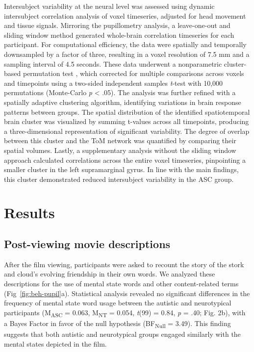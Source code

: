 Intersubject variability at the neural level was assessed using dynamic intersubject correlation analysis of voxel timeseries, adjusted for head movement and tissue signals. Mirroring the pupillometry analysis, a leave-one-out and sliding window method generated whole-brain correlation timeseries for each participant. For computational efficiency, the data were spatially and temporally downsampled by a factor of three, resulting in a voxel resolution of 7.5 mm and a sampling interval of 4.5 seconds. These data underwent a nonparametric cluster-based permutation test \citep{maris2007}, which corrected for multiple comparisons across voxels and timepoints using a two-sided independent samples \textit{t}-test with 10,000 permutations (Monte-Carlo \textit{p} < .05). The analysis was further refined with a spatially adaptive clustering algorithm, identifying variations in brain response patterns between groups. The spatial distribution of the identified spatiotemporal brain cluster was visualized by summing t-values across all timepoints, producing a three-dimensional representation of significant variability. The degree of overlap between this cluster and the ToM network was quantified by comparing their spatial volumes. Lastly, a supplementary analysis without the sliding window approach calculated correlations across the entire voxel timeseries, pinpointing a smaller cluster in the left supramarginal gyrus. In line with the main findings, this cluster demonstrated reduced intersubject variability in the ASC group.

\section*{Results}
\subsection*{Post-viewing movie descriptions }
After the film viewing, participants were asked to recount the story of the stork and cloud's evolving friendship in their own words. We analyzed these descriptions for the use of mental state words and other content-related terms (Fig~\ref{fig:beh-pupil}a). Statistical analysis revealed no significant differences in the frequency of mental state word usage between the autistic and neurotypical participants (M\textsubscript{ASC} = 0.063, M\textsubscript{NT} = 0.054, \textit{t}(99) = 0.84, \textit{p} = .40; Fig. 2b), with a Bayes Factor in favor of the null hypothesis (BF\textsubscript{Null} = 3.49). This finding suggests that both autistic and neurotypical groups engaged similarly with the mental states depicted in the film.

